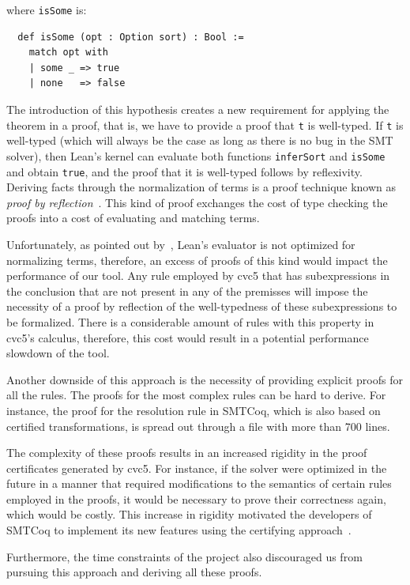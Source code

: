 where \texttt{isSome} is:

\begin{verbatim}
  def isSome (opt : Option sort) : Bool :=
    match opt with
    | some _ => true
    | none   => false
\end{verbatim}

The introduction of this hypothesis creates a new requirement for applying
the theorem in a proof, that is, we have to provide a proof that \texttt{t} is well-typed.
%
If \texttt{t} is well-typed (which will always be the case as long
as there is no bug in the SMT solver), then Lean's kernel can evaluate
both functions \texttt{inferSort} and \texttt{isSome} and obtain \texttt{true},
and the proof that it is well-typed follows by reflexivity.
%
Deriving facts through the normalization of terms is a proof technique known as
\textit{proof by reflection}~\cite{reflProof}.
%
This kind of proof exchanges the cost of type checking the proofs into a cost of
evaluating and matching terms.

Unfortunately, as pointed out by~\cite{ringLean}, Lean's evaluator
is not optimized for normalizing terms, therefore, an excess of proofs
of this kind would impact the performance of our tool.
%
Any rule employed by cvc5 that has subexpressions in the conclusion that are
not present in any of the premisses will impose the necessity of a proof
by reflection of the well-typedness of these subexpressions to be formalized.
%
There is a considerable amount of rules with this property in cvc5's calculus,
therefore, this cost would result in a potential performance slowdown of the tool.

Another downside of this approach is the necessity of providing explicit proofs for all
the rules. The proofs for the most complex rules can be hard to derive.
%
For instance, the proof for the resolution rule in SMTCoq,
which is also based on certified transformations, is spread out through a file with more than
700 lines. 

The complexity of these proofs results in an increased rigidity in the proof certificates
generated by cvc5.
%
For instance, if the solver were optimized in the future in a manner that required 
modifications to the semantics of certain rules employed in the proofs, it would be
necessary to prove their correctness again, which would be costly.
%
This increase in rigidity motivated the developers of SMTCoq to implement its new features
using the certifying approach~\cite{snipe, snipe2}.

Furthermore, the time constraints of the project also discouraged us from pursuing
this approach and deriving all these proofs.



